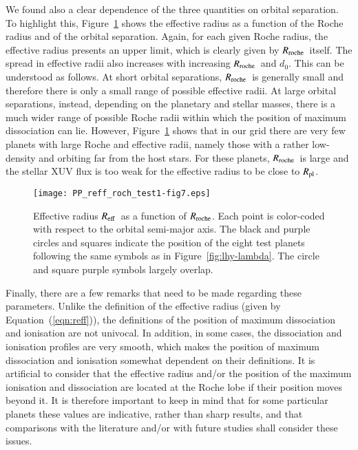 \documentclass{aa}
\def\Reff{$R_{\rm eff}$}
\def\roche{$R_{\rm roche}$}
\def\Rpl{$R_{\rm pl}$}
\begin{document}
We found also a clear dependence of the three quantities on orbital separation. To highlight this, Figure~\ref{fig:rdis-lambda} shows the effective radius as a function of the Roche radius and of the orbital separation. Again, for each given Roche radius, the effective radius presents an upper limit, which is clearly given by \roche\ itself. The spread in effective radii also increases with increasing \roche\ and $d_0$. This can be understood as follows. At short orbital separations, \roche\ is generally small and therefore there is only a small range of possible effective radii. At large orbital separations, instead, depending on the planetary and stellar masses, there is a much wider range of possible Roche radii within which the position of maximum dissociation can lie. However, Figure~\ref{fig:rdis-lambda} shows that in our grid there are very few planets with large Roche and effective radii, namely those with a rather low-density and orbiting far from the host stars. For these planets, \roche\ is large and the stellar XUV flux is too weak for the effective radius to be close to \Rpl.
\begin{figure}[h!]
\texttt{[image: PP\_reff\_roch\_test1-fig7.eps]}
\caption{{Effective radius \Reff\ as a function of \roche. Each
point is color-coded with respect to the orbital semi-major axis.
The black and purple circles and squares indicate the position of
the eight test planets following the same symbols as in
Figure~\ref{fig:lhy-lambda}. The circle and square purple symbols
largely overlap.}} \label{fig:rdis-lambda}
\end{figure}


Finally, there are a few remarks that need to be made regarding
these parameters. Unlike the definition of the effective radius
(given by Equation~(\ref{eqn:reff})), the definitions of the
position of maximum dissociation and ionisation are not univocal.
In addition, in some cases, the dissociation and ionisation
profiles are very smooth, which makes the position of maximum
dissociation and ionisation somewhat dependent on their
definitions. It is artificial to consider that the effective
radius and/or the position of the maximum ionisation and
dissociation are located at the Roche lobe if their position moves
beyond it. It is therefore important to keep in mind that for some
particular planets these {values are indicative,} rather than
sharp results, and that comparisons with the literature and/or
with future studies shall consider these issues.
%
\end{document}
